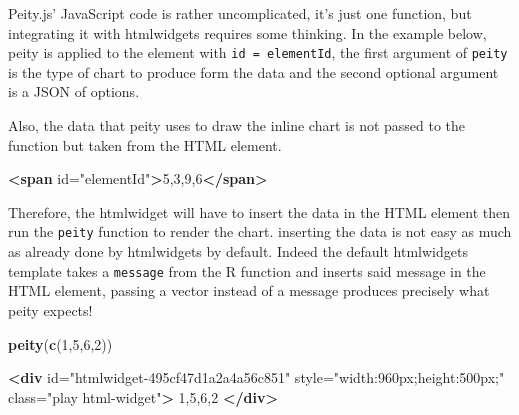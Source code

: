 \documentclass[
]{krantz}
\makeatletter
\newenvironment{Shaded}{\begin{snugshade}}{\end{snugshade}}
\newcommand{\AttributeTok}[1]{\textcolor[rgb]{0.61,0.61,0.61}{#1}}
\newcommand{\DataTypeTok}[1]{\textcolor[rgb]{0.27,0.27,0.27}{#1}}
\newcommand{\DecValTok}[1]{\textcolor[rgb]{0.06,0.06,0.06}{#1}}
\newcommand{\KeywordTok}[1]{\textcolor[rgb]{0.27,0.27,0.27}{\textbf{#1}}}
\newcommand{\NormalTok}[1]{#1}
\newcommand{\OperatorTok}[1]{\textcolor[rgb]{0.43,0.43,0.43}{\textbf{#1}}}
\newcommand{\OtherTok}[1]{\textcolor[rgb]{0.37,0.37,0.37}{#1}}
\newcommand{\StringTok}[1]{\textcolor[rgb]{0.5,0.5,0.5}{#1}}
\newenvironment{kframe}{%
\medskip{}
\setlength{\fboxsep}{.8em}
 \def\at@end@of@kframe{}%
 \ifinner\ifhmode%
  \def\at@end@of@kframe{\end{minipage}}%
  \begin{minipage}{\columnwidth}%
 \fi\fi%
 \def\FrameCommand##1{\hskip\@totalleftmargin \hskip-\fboxsep
 \colorbox{shadecolor}{##1}\hskip-\fboxsep
     \hskip-\linewidth \hskip-\@totalleftmargin \hskip\columnwidth}%
 \MakeFramed {\advance\hsize-\width
   \@totalleftmargin\z@ \linewidth\hsize
   \@setminipage}}%
 {\par\unskip\endMakeFramed%
 \at@end@of@kframe}
\renewenvironment{Shaded}{\begin{kframe}}{\end{kframe}}
\makeatother
\begin{document}
Peity.js' JavaScript code is rather uncomplicated, it's just one function, but integrating it with htmlwidgets requires some thinking. In the example below, peity is applied to the element with \texttt{id\ =\ \textquotesingle{}elementId\textquotesingle{}}, the first argument of \texttt{peity} is the type of chart to produce form the data and the second optional argument is a JSON of options.

\begin{Shaded}
\end{Shaded}

Also, the data that peity uses to draw the inline chart is not passed to the function but taken from the HTML element.

\begin{Shaded}
\begin{Highlighting}[]
\KeywordTok{<span}\OtherTok{ id=}\StringTok{"elementId"}\KeywordTok{>}\NormalTok{5,3,9,6}\KeywordTok{</span>}
\end{Highlighting}
\end{Shaded}

Therefore, the htmlwidget will have to insert the data in the HTML element then run the \texttt{peity} function to render the chart. inserting the data is not easy as much as already done by htmlwidgets by default. Indeed the default htmlwidgets template takes a \texttt{message} from the R function and inserts said message in the HTML element, passing a vector instead of a message produces precisely what peity expects!

\begin{Shaded}
\begin{Highlighting}[]
\KeywordTok{peity}\NormalTok{(}\KeywordTok{c}\NormalTok{(}\DecValTok{1}\NormalTok{,}\DecValTok{5}\NormalTok{,}\DecValTok{6}\NormalTok{,}\DecValTok{2}\NormalTok{))}
\end{Highlighting}
\end{Shaded}

\begin{Shaded}
\begin{Highlighting}[]
\KeywordTok{<div} 
\OtherTok{  id=}\StringTok{"htmlwidget{-}495cf47d1a2a4a56c851"} 
\OtherTok{  style=}\StringTok{"width:960px;height:500px;"} 
\OtherTok{  class=}\StringTok{"play html{-}widget"}\KeywordTok{>}
\NormalTok{  1,5,6,2}
\KeywordTok{</div>}
\end{Highlighting}
\end{Shaded}
\end{document}
